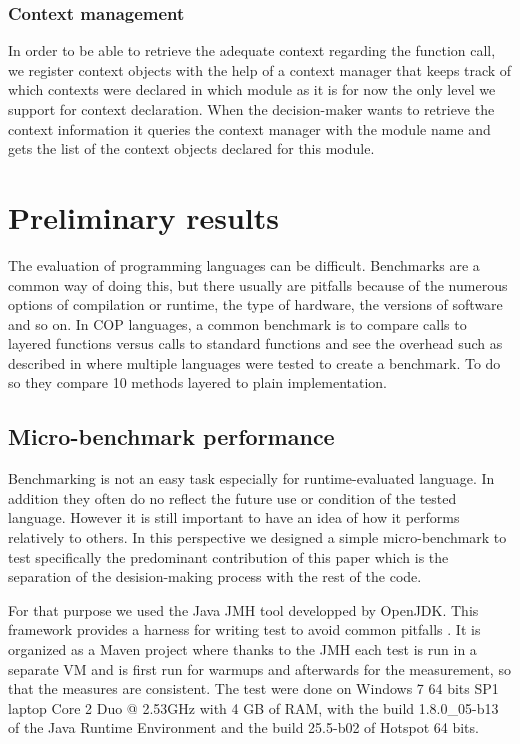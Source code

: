 \documentclass{sig-alternate}
\begin{document}
\subsubsection{Context management}
In order to be able to retrieve the adequate context regarding the function call, we register context objects with the help of a context manager that keeps track of which contexts were declared in which module as it is for now the only level we support for context declaration. When the decision-maker wants to retrieve the context information it queries the context manager with the module name and gets the list of the context objects declared for this module.

 
\section{Preliminary results}
\label{results}

The evaluation of programming languages can be difficult. Benchmarks are a common way of doing this, but there usually are pitfalls because of the numerous options of compilation or runtime, the type of hardware, the versions of software and so on. In COP languages, a common benchmark is to compare calls to layered functions versus calls to standard functions and see the overhead such as described in \cite{appeltauer_comparison_2009} where multiple languages were tested to create a benchmark. To do so they compare 10 methods layered to plain implementation. 

\subsection{Micro-benchmark performance}
Benchmarking is not an easy task especially for runtime-evaluated language. In addition they often do no reflect the future use or condition of the tested language. However it is still important to have an idea of how it performs relatively to others. In this perspective we designed a simple micro-benchmark to test specifically the predominant contribution of this paper which is the separation of the desision-making process with the rest of the code.

For that purpose we used the Java JMH tool developped by OpenJDK. This framework provides a harness for writing test to avoid common pitfalls \cite{jponge_benchmarking_2014}. It is organized as a Maven project where thanks to the JMH each test is run in a separate VM and is first run for warmups and afterwards for the measurement, so that the measures are consistent. The test were done on Windows 7 64 bits SP1 laptop Core 2 Duo @ 2.53GHz with 4 GB of RAM, with the build 1.8.0\_05-b13 of the Java Runtime Environment and the build 25.5-b02 of Hotspot 64 bits.
\end{document}
